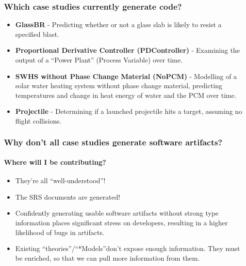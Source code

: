 \documentclass{beamer}
\begin{document}
\begin{frame}
    \frametitle{Which case studies currently generate code?}

    \begin{itemize}
        \item<1-> \textbf{GlassBR} - Predicting whether or not a glass slab is likely to resist a specified blast.
        \item<2-> \textbf{Proportional Derivative Controller (PDController)} - Examining the output of a ``Power Plant'' (Process Variable) over time.
        \item<3-> \textbf{SWHS without Phase Change Material (NoPCM)} - Modelling of a solar water heating system without phase change material, predicting temperatures and change in heat energy of water and the PCM over time.
        \item<4-> \textbf{Projectile} - Determining if a launched projectile hits a target, assuming no flight collisions.
    \end{itemize}
\end{frame}

\begin{frame}
    \frametitle{Why don't all case studies generate software artifacts?}
    \framesubtitle{Where will I be contributing?}

    \begin{itemize}
        \item<3-> They're all ``well-understood''!
        \item<4-> The SRS documents are generated!\\
    \end{itemize}

    \begin{itemize}
        \item<6-> Confidently generating usable software artifacts without strong type information places significant stress on developers, resulting in a higher likelihood of bugs in artifacts.
        \item<7-> Existing ``theories''/``*Models''\footnotemark[1] don't expose enough information. They must be enriched, so that we can pull more information from them.
    \end{itemize}

\end{frame}
\end{document}
